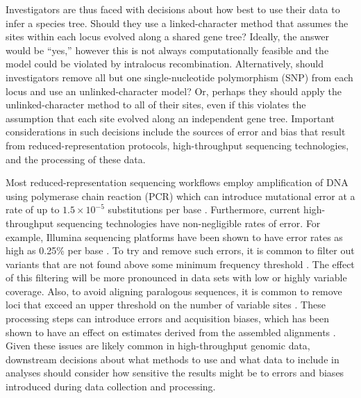 Investigators are thus faced with decisions about how best to
use their data to infer a species tree.
Should they use a linked-character method that assumes the sites within each
locus evolved along a shared gene tree?
Ideally, the answer would be ``yes,'' however this is not always
computationally feasible and the model could be violated by intralocus
recombination.
Alternatively, should investigators remove all but one single-nucleotide
polymorphism (SNP) from each locus and use an unlinked-character model?
Or, perhaps they should apply the unlinked-character method to all of their
sites, even if this violates the assumption that each site evolved along an
independent gene tree.
Important considerations in such decisions include
the sources of error and bias that result from reduced-representation protocols,
high-throughput sequencing technologies, and the processing of these data.

Most reduced-representation sequencing workflows employ amplification of DNA
using polymerase chain reaction (PCR) which can introduce mutational error at a
rate of up to $1.5\times10^{-5}$ substitutions per base \citep{potapovExaminingSourcesError2017}.
Furthermore, current high-throughput sequencing technologies have non-negligible rates of error.
For example, Illumina sequencing platforms have been shown to have error rates
as high as 0.25\% per base \citep{pfeifferSystematicEvaluationError2018}.
To try and remove such errors,
it is common to filter out variants that are not found above some minimum
frequency threshold
\citep{rochetteStacksAnalyticalMethods2019, linckMinorAlleleFrequency2019}.
The effect of this filtering will be more pronounced in data sets with low or
highly variable coverage.
Also, to avoid aligning paralogous sequences,
it is common to remove loci
that exceed an upper threshold on the number of variable
sites \citep{harveySimilarityThresholdsUsed2015}.
These processing steps can introduce errors and acquisition biases, which has
been shown to have an effect on estimates derived from the assembled alignments
\citep{harveySimilarityThresholdsUsed2015,linckMinorAlleleFrequency2019}.
Given these issues are likely common in high-throughput genomic data,
downstream decisions about what methods to use and what data to include in
analyses should consider how sensitive the results might be to
errors and biases introduced during data collection and processing.

